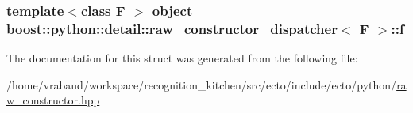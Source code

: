 \subsubsection[{f}]{\setlength{\rightskip}{0pt plus 5cm}template$<$class F $>$ object {\bf boost\+::python\+::detail\+::raw\+\_\+constructor\+\_\+dispatcher}$<$ F $>$\+::f\hspace{0.3cm}{\ttfamily [private]}}\label{structboost_1_1python_1_1detail_1_1raw__constructor__dispatcher_a055de51d7e8492c050508aa131ec1dd5}


The documentation for this struct was generated from the following file\+:\begin{DoxyCompactItemize}
\item 
/home/vrabaud/workspace/recognition\+\_\+kitchen/src/ecto/include/ecto/python/\hyperlink{raw__constructor_8hpp}{raw\+\_\+constructor.\+hpp}\end{DoxyCompactItemize}
